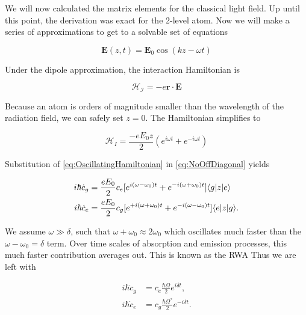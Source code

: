 We will now calculated the matrix elements for the classical light field. Up until this point, the derivation was exact for the 2-level atom. Now we will make a series of approximations to get to a solvable set of equations \cite{Leeuwen2017}

\begin{equation}\label{eq:CosineLightField}
	\mathbf{E}(z,t) = \mathbf{E}_0 \cos{(k z - \omega t)}
\end{equation}

Under the dipole approximation, the interaction Hamiltonian is \cite{Foot2005}

\begin{equation}
	\mathcal{H_I} = - e\mathbf{r}\cdot \mathbf{E}
\end{equation}

Because an atom is orders of magnitude smaller than the wavelength of the radiation field, we can safely set $z=0$. The Hamiltonian simplifies to 

\begin{equation}\label{eq:OscillatingHamiltonian}
	\mathcal{H}_I = \frac{-e E_0 z}{2} \left(e^{i \omega t} + e^{-i \omega t}\right)
\end{equation}

Substitution of \cref{eq:OscillatingHamiltonian} in \cref{eq:NoOffDiagonal} yields

\begin{subequations}\label{eq:ClassicalHamSubstituted}
	\begin{align}
		i \hbar \dot{c}_g &= \frac{e E_0}{2} c_e[e^{ i (\omega-\omega_0) t}+e^{-i(\omega+ \omega_0)t}] \langle g\rvert z \lvert e\rangle \\
		i \hbar \dot{c}_e &= \frac{e E_0}{2} c_g[e^{+i (\omega+\omega_0) t}+e^{-i(\omega- \omega_0)t}] \langle e\rvert z \lvert g\rangle  .
	\end{align}
\end{subequations}

We assume $\omega \gg \delta$, such that $\omega+\omega_0 \approx 2\omega_0$ which oscillates much faster than the $\omega-\omega_0=\delta$ term. Over time scales of absorption and emission processes, this much faster contribution averages out. This is known as the \ac{RWA} \cite{Vredenbregt2020,Loudon2000} Thus we are left with

\begin{subequations}\label{eq:Rabi}
	\begin{align}
		i \hbar \dot{c}_g &= c_e \frac{\hbar \Omega  }{2} e^{ i \delta t},\\
		i \hbar \dot{c}_e &= c_g \frac{\hbar \Omega^*}{2} e^{-i \delta t}.
	\end{align}
\end{subequations}


